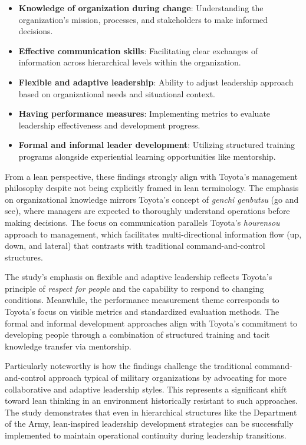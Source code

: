 \documentclass{article}
\begin{document}
	\begin{itemize}
		\item \textbf{Knowledge of organization during change}: Understanding the organization's mission, processes, and stakeholders to make informed decisions.
		\item \textbf{Effective communication skills}: Facilitating clear exchanges of information across hierarchical levels within the organization.
		\item \textbf{Flexible and adaptive leadership}: Ability to adjust leadership approach based on organizational needs and situational context.
		\item \textbf{Having performance measures}: Implementing metrics to evaluate leadership effectiveness and development progress.
		\item \textbf{Formal and informal leader development}: Utilizing structured training programs alongside experiential learning opportunities like mentorship.
	\end{itemize}

	From a lean perspective, these findings strongly align with Toyota's management philosophy despite not being explicitly framed in lean terminology. The emphasis on organizational knowledge mirrors Toyota's concept of \textit{genchi genbutsu} (go and see), where managers are expected to thoroughly understand operations before making decisions. The focus on communication parallels Toyota's \textit{hourensou} approach to management, which facilitates multi-directional information flow (up, down, and lateral) that contrasts with traditional command-and-control structures.

	The study's emphasis on flexible and adaptive leadership reflects Toyota's principle of \textit{respect for people} and the capability to respond to changing conditions. Meanwhile, the performance measurement theme corresponds to Toyota's focus on visible metrics and standardized evaluation methods. The formal and informal development approaches align with Toyota's commitment to developing people through a combination of structured training and tacit knowledge transfer via mentorship.

	Particularly noteworthy is how the findings challenge the traditional command-and-control approach typical of military organizations by advocating for more collaborative and adaptive leadership styles. This represents a significant shift toward lean thinking in an environment historically resistant to such approaches. The study demonstrates that even in hierarchical structures like the Department of the Army, lean-inspired leadership development strategies can be successfully implemented to maintain operational continuity during leadership transitions.
\end{document}
